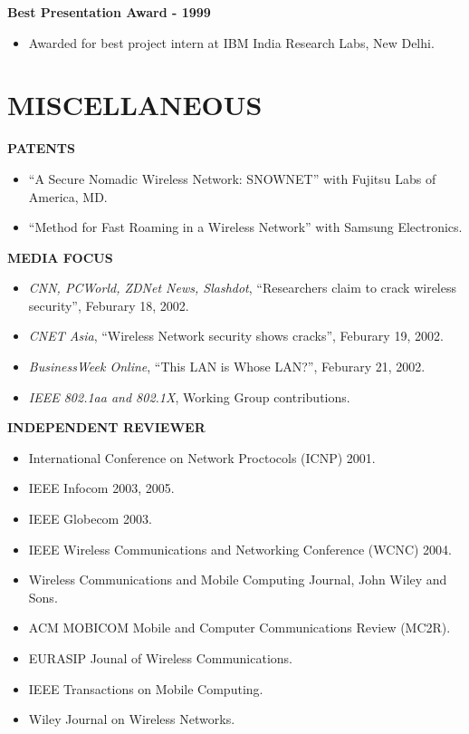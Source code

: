 \begin{resume}
{\bf Best Presentation Award - 1999}
    \begin{itemize}
         \item[] Awarded for best project intern at IBM India Research Labs, New Delhi. 
    \end{itemize}

\section{MISCELLANEOUS}
\vspace{0.1in}

{\bf PATENTS}
    \begin{itemize}
         \item[] ``A Secure Nomadic Wireless Network: SNOWNET'' with Fujitsu Labs of America, MD.
	 \item[] ``Method for Fast Roaming in a Wireless Network'' with Samsung Electronics.
    \end{itemize}

{\bf MEDIA FOCUS}
    \begin{itemize}
         \item[] {\em CNN, PCWorld, ZDNet News, Slashdot},  ``Researchers claim to crack
           wireless security'', Feburary 18, 2002.
         \item[] {\em CNET Asia}, ``Wireless Network security shows cracks'', Feburary 19, 2002.  
         \item[] {\em BusinessWeek Online}, ``This LAN is Whose LAN?'', Feburary 21, 2002. 
	 \item[] {\em IEEE 802.1aa and 802.1X}, Working Group contributions.
    \end{itemize}

{\bf INDEPENDENT REVIEWER} 
    \begin{itemize}
         \item[]  International Conference on Network Proctocols (ICNP) 2001.
         \item[]  IEEE Infocom 2003, 2005.
         \item[]  IEEE Globecom 2003.
         \item[]  IEEE Wireless Communications and Networking Conference (WCNC) 2004.
         \item[]  Wireless Communications and Mobile Computing Journal, John Wiley and Sons.
         \item[]  ACM MOBICOM Mobile and Computer Communications Review (MC2R).
	 \item[]  EURASIP Jounal of Wireless Communications.
	 \item[]  IEEE Transactions on Mobile Computing.
         \item[]  Wiley Journal on Wireless Networks.
    \end{itemize}


\end{resume}
